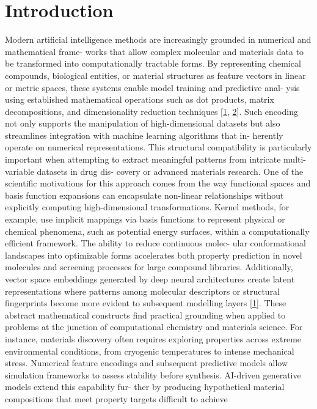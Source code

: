\documentclass[
]{article}
\begin{document}
\section{Introduction}\label{introduction}

Modern artificial intelligence methods are increasingly grounded in
numerical and mathematical frame- works that allow complex molecular and
materials data to be transformed into computationally tractable forms.
By representing chemical compounds, biological entities, or material
structures as feature vectors in linear or metric spaces, these systems
enable model training and predictive anal- ysis using established
mathematical operations such as dot products, matrix decompositions, and
dimensionality reduction techniques {[}\hyperref[_bookmark41]{1},
\hyperref[_bookmark42]{2}{]}. Such encoding not only supports the
manipulation of high-dimensional datasets but also streamlines
integration with machine learning algorithms that in- herently operate
on numerical representations. This structural compatibility is
particularly important when attempting to extract meaningful patterns
from intricate multi-variable datasets in drug dis- covery or advanced
materials research. One of the scientific motivations for this approach
comes from the way functional spaces and basis function expansions can
encapsulate non-linear relationships without explicitly computing
high-dimensional transformations. Kernel methods, for example, use
implicit mappings via basis functions to represent physical or chemical
phenomena, such as potential energy surfaces, within a computationally
efficient framework. The ability to reduce continuous molec- ular
conformational landscapes into optimizable forms accelerates both
property prediction in novel molecules and screening processes for large
compound libraries. Additionally, vector space embeddings generated by
deep neural architectures create latent representations where patterns
among molecular descriptors or structural fingerprints become more
evident to subsequent modelling layers {[}\hyperref[_bookmark41]{1}{]}.
These abstract mathematical constructs find practical grounding when
applied to problems at the junction of computational chemistry and
materials science. For instance, materials discovery often requires
exploring properties across extreme environmental conditions, from
cryogenic temperatures to intense mechanical stress. Numerical feature
encodings and subsequent predictive models allow simulation frameworks
to assess stability before synthesis. AI-driven generative models extend
this capability fur- ther by producing hypothetical material
compositions that meet property targets difficult to achieve
\end{document}
